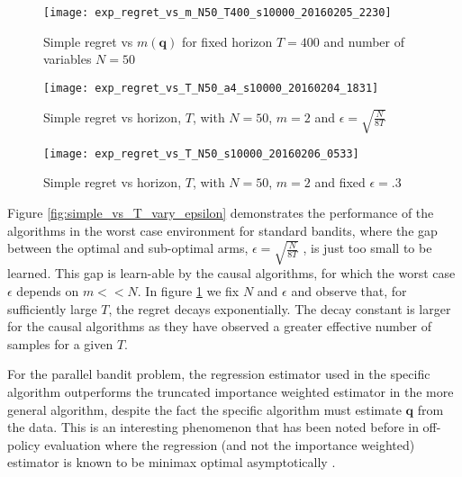 \begin{figure}
  \centering
  \begin{minipage}[b]{0.3\textwidth}
    \texttt{[image: exp\_regret\_vs\_m\_N50\_T400\_s10000\_20160205\_2230]}
    \caption{Simple regret vs $m(\boldsymbol{q})$ for fixed horizon $T=400$ and number of variables $N = 50$}
    \label{fig:simple_vs_m}
  \end{minipage}
  \hfill
  \begin{minipage}[b]{0.3\textwidth}
    \texttt{[image: exp\_regret\_vs\_T\_N50\_a4\_s10000\_20160204\_1831]}
    \caption{Simple regret vs horizon, $T$, with $N = 50$, $m=2$ and $\epsilon = \sqrt{\frac{N}{8T}}$}
    \label{fig:simple_vs_T_vary_epsilon}
  \end{minipage}
  \hfill
  \begin{minipage}[b]{0.3\textwidth}
    \texttt{[image: exp\_regret\_vs\_T\_N50\_s10000\_20160206\_0533]}
    \caption{Simple regret vs horizon, $T$, with $N = 50$, $m=2$ and fixed $\epsilon = .3$}
    \label{fig:simple_vs_T}
  \end{minipage}
\end{figure}


Figure \ref{fig:simple_vs_T_vary_epsilon} demonstrates the performance of the algorithms in the worst case environment for standard bandits, where the gap between the optimal and sub-optimal arms, $\epsilon = \sqrt{\frac{N}{8T}}$ , is just too small to be learned. This gap is learn-able by the causal algorithms, for which the worst case $\epsilon$ depends on $m << N$. In figure \ref{fig:simple_vs_T} we fix $N$ and $\epsilon$ and observe that, for sufficiently large $T$, the regret decays exponentially. The decay constant is larger for the causal algorithms as they have observed a greater effective number of samples for a given $T$. 

For the parallel bandit problem, the regression estimator used in the specific algorithm outperforms the truncated importance weighted estimator in the more general algorithm, despite the fact the specific algorithm must estimate $\boldsymbol{q}$ from the data. 
This is an interesting phenomenon that has been noted before in off-policy evaluation where the regression (and not the importance weighted) estimator is known to be minimax optimal asymptotically \citep{LMS14}.

